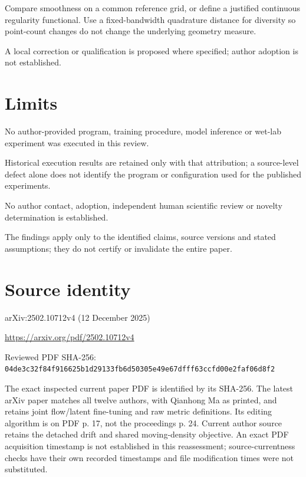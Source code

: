 \documentclass[11pt]{article}
\begin{document}
Compare smoothness on a common reference grid, or define a justified continuous regularity functional. Use a fixed-bandwidth quadrature distance for diversity so point-count changes do not change the underlying geometry measure.

A local correction or qualification is proposed where specified; author adoption is not established.

\section*{Limits}

No author-provided program, training procedure, model inference or wet-lab experiment was executed in this review.\par

Historical execution results are retained only with that attribution; a source-level defect alone does not identify the program or configuration used for the published experiments.\par

No author contact, adoption, independent human scientific review or novelty determination is established.\par

The findings apply only to the identified claims, source versions and stated assumptions; they do not certify or invalidate the entire paper.\par

\section*{Source identity}

arXiv:2502.10712v4 (12 December 2025)

\url{https://arxiv.org/pdf/2502.10712v4}

Reviewed PDF SHA-256: \nolinkurl{04de3c32f84f916625b1d29133fb6d50305e49e67dfff63ccfd00e2faf06d8f2}

The exact inspected current paper PDF is identified by its SHA-256. The latest arXiv paper matches all twelve authors, with Qianhong Ma as printed, and retains joint flow/latent fine-tuning and raw metric definitions. Its editing algorithm is on PDF p. 17, not the proceedings p. 24. Current author source retains the detached drift and shared moving-density objective. An exact PDF acquisition timestamp is not established in this reassessment; source-currentness checks have their own recorded timestamps and file modification times were not substituted.
\end{document}
